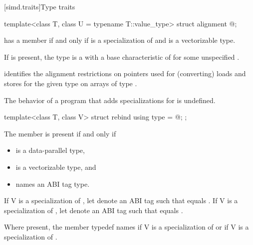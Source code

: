 [simd.traits]{Type traits}

\begin{itemdecl}
template<class T, class U = typename T::value_type> struct alignment { @\seebelow@ };
\end{itemdecl}

\begin{itemdescr}
\pnum
{} has a member  if and only if
 is a specialization of  and
 is a vectorizable type.

\pnum
If  is present, the type  is a
 with a base characteristic of
 for some unspecified
.
\begin{note}
 identifies the alignment restrictions on pointers used for
(converting) loads and stores for the given type  on arrays of type
.
\end{note}

\pnum
The behavior of a program that adds specializations for 
is undefined.
\end{itemdescr}

\begin{itemdecl}
template<class T, class V> struct rebind { using type = @\seebelow@; };
\end{itemdecl}

\begin{itemdescr}
\pnum
The member  is present if and only if
\begin{itemize}
\item {} is a data-parallel type,
\item {} is a vectorizable type, and
\item {} names an ABI tag type.
\end{itemize}

\pnum
If \tcode V is a specialization of , let  denote
an ABI tag such that  equals
.
If \tcode V is a specialization of , let 
denote an ABI tag such that  equals .

\pnum
Where present, the member typedef  names 
if \tcode V is a specialization of  or
 if \tcode V is a specialization of
.
\end{itemdescr}

